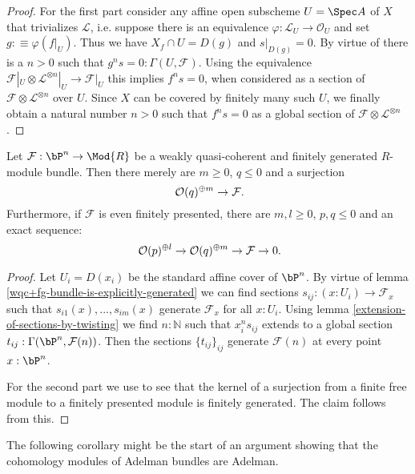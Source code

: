 \begin{proof}
  For the first part consider any affine open subscheme $U=\Spec A$ of $X$ that trivializes $\mathcal L$,
  i.e. suppose there is an equivalence  $\varphi:\mathcal L_U \to \mathcal O_U$ and set $g :\equiv \varphi(f|_U)$.
  Thus we have $X_f\cap U = D(g)$ and $s|_{D(g)}=0$.
  By virtue of  there is a $n>0$ such that $g^ns=0:\Gamma (U,\mathcal F)$.
  Using the equivalence $\mathcal F|_U\otimes\mathcal L^{\otimes n}|_U \to \mathcal F|_U$ this implies $f^ns=0$,
  when considered as a section of $\mathcal F\otimes\mathcal L^{\otimes n}$ over $U$.
  Since $X$ can be covered by finitely many such $U$, we finally obtain a natural number $n>0$ such that $f^ns=0$ as a global section of $\mathcal F\otimes\mathcal L^{\otimes n}$.

\end{proof}

\begin{proposition}
  \label{fp-module-bundle-globally-generated}
  Let $\mathcal F:\bP^n \to \Mod{R}$ be a weakly quasi-coherent and finitely generated $R$-module bundle.
  Then there merely are $m\geq 0$, $q\leq 0$ and a surjection
  \[ \mathcal O(q)^{\oplus m}\to \mathcal F\rlap{.}\]
  Furthermore, if $\mathcal F$ is even finitely presented, there are $m,l\geq 0$, $p ,q\leq 0$ and an exact sequence:
  \[ \mathcal O(p)^{\oplus l}\to \mathcal O(q)^{\oplus m}\to \mathcal F\to 0\rlap{.}\]
\end{proposition}
\begin{proof}
  Let $U_i = D(x_i)$ be the standard affine cover of $\bP^n$.
  By virtue of lemma \ref{wqc+fg-bundle-is-explicitly-generated} we can find sections $s_{ij} : (x:U_i) \to \mathcal F_x$ such that $s_{i1}(x), ..., s_{im}(x)$ generate $\mathcal F_x$ for all $x:U_i$.
  Using lemma \ref{extension-of-sections-by-twisting} we find $n:\mathbb{N}$ such that $x_i^ns_{ij}$ extends to a global section $t_{ij}:\Gamma (\bP^n,\mathcal F(n))$.
  Then the sections $\{t_{ij}\}_{ij}$ generate $\mathcal F(n)$ at every point $x:\bP^n$.

  For the second part we use \cite[Chapter IV, 1.0 Lemma]{lombardi-quitte} to see that the kernel of a surjection from a finite free module to a finitely presented module is finitely generated.
  The claim follows from this.
\end{proof}

The following corollary might be the start of an argument showing that the cohomology modules of Adelman bundles are Adelman.

